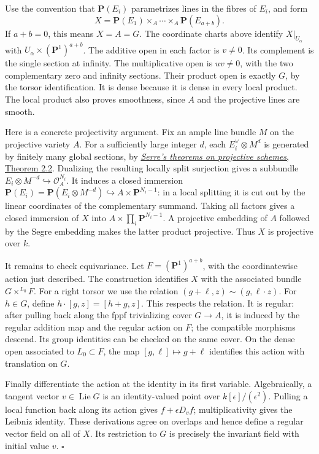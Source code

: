 \documentclass[
  11pt,
  a4paper,
]{article}
\begin{document}
Use the convention that \(\mathbf P(E_i)\) parametrizes lines in the
fibres of \(E_i\), and form \[
 X=\mathbf P(E_1)\times_A\cdots\times_A\mathbf P(E_{a+b}).
 \tag{22.101}
\] If \(a+b=0\), this means \(X=A=G\). The coordinate charts above
identify \(X|_{U_\alpha}\) with \(U_\alpha\times(\mathbf P^1)^{a+b}\).
The additive open in each factor is \(v\ne0\). Its complement is the
single section at infinity. The multiplicative open is \(uv\ne0\), with
the two complementary zero and infinity sections. Their product open is
exactly \(G\), by the torsor identification. It is dense because it is
dense in every local product. The local product also proves smoothness,
since \(A\) and the projective lines are smooth.

Here is a concrete projectivity argument. Fix an ample line bundle \(M\)
on the projective variety \(A\). For a sufficiently large integer \(d\),
each \(E_i^\vee\otimes M^d\) is generated by finitely many global
sections, by
\href{https://kokunoyumeto.github.io/open-math-courses-public/courses/AG-QC/serres-theorems-on-projective-schemes.html\#2-descending-induction-proves-serre-s-theorems}{\emph{Serre's
theorems on projective schemes}, Theorem 2.2}. Dualizing the resulting
locally split surjection gives a subbundle
\(E_i\otimes M^{-d}\hookrightarrow\mathcal O_A^{N_i}\). It induces a
closed immersion
\(\mathbf P(E_i)=\mathbf P(E_i\otimes M^{-d})\hookrightarrow A\times\mathbf P^{N_i-1}\):
in a local splitting it is cut out by the linear coordinates of the
complementary summand. Taking all factors gives a closed immersion of
\(X\) into \(A\times\prod_i\mathbf P^{N_i-1}\). A projective embedding
of \(A\) followed by the Segre embedding makes the latter product
projective. Thus \(X\) is projective over \(k\).

It remains to check equivariance. Let \(F=(\mathbf P^1)^{a+b}\), with
the coordinatewise action just described. The construction identifies
\(X\) with the associated bundle \(G\times^{L_0}F\). For a right torsor
we use the relation \((g+\ell,z)\sim(g,\ell\cdot z)\). For \(h\in G\),
define \(h\cdot[g,z]=[h+g,z]\). This respects the relation. It is
regular: after pulling back along the fppf trivializing cover
\(G\to A\), it is induced by the regular addition map and the regular
action on \(F\); the compatible morphisms descend. Its group identities
can be checked on the same cover. On the dense open associated to
\(L_0\subset F\), the map \([g,\ell]\mapsto g+\ell\) identifies this
action with translation on \(G\).

Finally differentiate the action at the identity in its first variable.
Algebraically, a tangent vector \(v\in\operatorname{Lie}G\) is an
identity-valued point over \(k[\epsilon]/(\epsilon^2)\). Pulling a local
function back along its action gives \(f+\epsilon D_v f\);
multiplicativity gives the Leibniz identity. These derivations agree on
overlaps and hence define a regular vector field on all of \(X\). Its
restriction to \(G\) is precisely the invariant field with initial value
\(v\). \(\square\)
\end{document}

